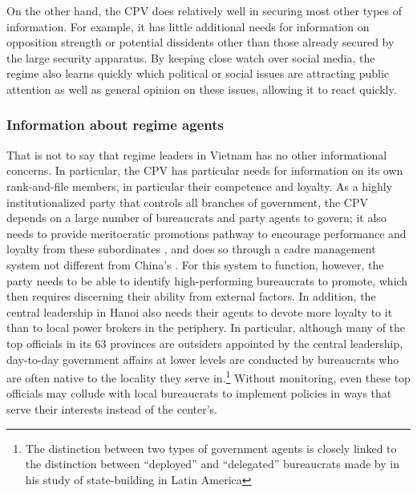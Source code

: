 \documentclass[12pt]{article}
\newcommand{\1}{\mathbbm{1}}
\begin{document}
On the other hand, the CPV does relatively well in securing most other types of information. For example, it has little additional needs for information on opposition strength or potential dissidents other than those already secured by the large security apparatus. By keeping close watch over social media, the regime also learns quickly which political or social issues are attracting public attention as well as general opinion on these issues, allowing it to react quickly. 

\subsubsection{Information about regime agents}

That is not to say that regime leaders in Vietnam has no other informational concerns. In particular, the CPV has particular needs for information on its own rank-and-file members, in particular their competence and loyalty. As a highly institutionalized party that controls all branches of government, the CPV depends on a large number of bureaucrats and party agents to govern; it also needs to provide meritocratic promotions pathway to encourage performance and loyalty from these subordinates \citep{Svolik2012}, and does so through a cadre management system not different from China's \citep{Manion1985}. For this system to function, however, the party needs to be able to identify high-performing bureaucrats to promote, which then requires discerning their ability from external factors. In addition, the central leadership in Hanoi also needs their agents to devote more loyalty to it than to local power brokers in the periphery. In particular, although many of the top officials in its 63 provinces are outsiders appointed by the central leadership, day-to-day government affairs at lower levels are conducted by bureaucrats who are often native to the locality they serve in.\footnote{The distinction between two types of government agents is closely linked to the distinction between ``deployed'' and ``delegated'' bureaucrats made by \cite{Soifer2015} in his study of state-building in Latin America} Without monitoring, even these top officials may collude with local bureaucrats to implement policies in ways that serve their interests instead of the center's.
\end{document}
